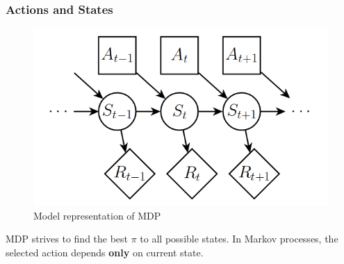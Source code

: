 \documentclass[aspectratio=169]{beamer}
\begin{document}
\begin{frame}
	\frametitle{Actions and States}
	\begin{figure}
	\includegraphics[scale=0.3]{img/mdp-states.png}
	\caption{Model representation of MDP \cite{mdp-process}}
	\end{figure}
	MDP strives to find the best $\pi$ to all possible states. 
	In Markov processes, the selected action depends \textbf{only} on current state.
\end{frame}
\end{document}
